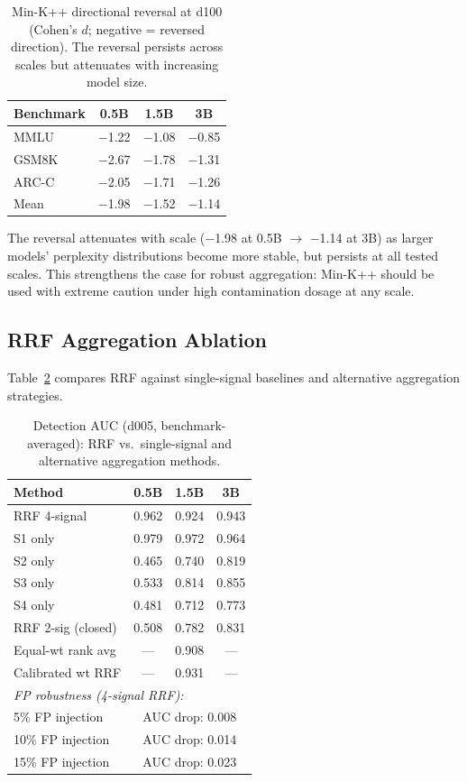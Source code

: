\documentclass[11pt,a4paper]{article}
\begin{document}
\begin{table}[t]
\centering
\small
\caption{Min-K++ directional reversal at d100 (Cohen's $d$; negative = reversed direction). The reversal persists across scales but attenuates with increasing model size.}
\label{tab:reversal}
\begin{tabular}{lccc}
\toprule
\textbf{Benchmark} & \textbf{0.5B} & \textbf{1.5B} & \textbf{3B} \\
\midrule
MMLU  & $-$1.22 & $-$1.08 & $-$0.85 \\
GSM8K & $-$2.67 & $-$1.78 & $-$1.31 \\
ARC-C & $-$2.05 & $-$1.71 & $-$1.26 \\
\midrule
Mean  & $-$1.98 & $-$1.52 & $-$1.14 \\
\bottomrule
\end{tabular}
\end{table}

The reversal attenuates with scale ($-$1.98 at 0.5B $\to$ $-$1.14 at 3B) as larger models' perplexity distributions become more stable, but persists at all tested scales.
This strengthens the case for robust aggregation: Min-K++ should be used with extreme caution under high contamination dosage at any scale.

\subsection{RRF Aggregation Ablation}
\label{sec:rrf}

Table~\ref{tab:rrf} compares RRF against single-signal baselines and alternative aggregation strategies.

\begin{table}[t]
\centering
\small
\caption{Detection AUC (d005, benchmark-averaged): RRF vs.\ single-signal and alternative aggregation methods.}
\label{tab:rrf}
\begin{tabular}{lccc}
\toprule
\textbf{Method} & \textbf{0.5B} & \textbf{1.5B} & \textbf{3B} \\
\midrule
RRF 4-signal     & 0.962 & 0.924 & 0.943 \\
S1 only          & 0.979 & 0.972 & 0.964 \\
S2 only          & 0.465 & 0.740 & 0.819 \\
S3 only          & 0.533 & 0.814 & 0.855 \\
S4 only          & 0.481 & 0.712 & 0.773 \\
RRF 2-sig (closed) & 0.508 & 0.782 & 0.831 \\
Equal-wt rank avg & --- & 0.908 & --- \\
Calibrated wt RRF & --- & 0.931 & --- \\
\midrule
\multicolumn{4}{l}{\textit{FP robustness (4-signal RRF):}} \\
5\% FP injection  & \multicolumn{3}{c}{AUC drop: 0.008} \\
10\% FP injection & \multicolumn{3}{c}{AUC drop: 0.014} \\
15\% FP injection & \multicolumn{3}{c}{AUC drop: 0.023} \\
\bottomrule
\end{tabular}
\end{table}
\end{document}
